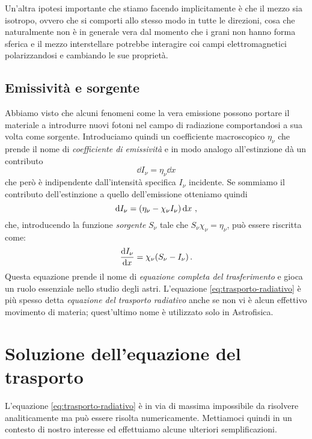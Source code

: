         Un'altra ipotesi importante che stiamo facendo implicitamente è che il mezzo sia isotropo, ovvero che si comporti allo stesso modo in tutte le direzioni, cosa che naturalmente non è in generale vera dal momento che i grani non hanno forma sferica e il mezzo interstellare potrebbe interagire coi campi elettromagnetici polarizzandosi e cambiando le sue proprietà.
    \subsection{Emissività e sorgente}
        Abbiamo visto che alcuni fenomeni come la vera emissione possono portare il materiale a introdurre nuovi fotoni nel campo di radiazione comportandosi a sua volta come sorgente. Introduciamo quindi un coefficiente macroscopico $\eta_\nu$ che prende il nome di \emph{coefficiente di emissività} e in modo analogo all'estinzione dà un contributo
        \begin{equation}
            \label{eq:emissività}
            \dd{I_\nu} = \eta_{\nu}\dd{x}
        \end{equation}
        che però è indipendente dall'intensità specifica $I_\nu$ incidente. Se sommiamo il contributo dell'estinzione a quello dell'emissione otteniamo quindi
        \begin{equation*}
            \dd{I_\nu} = \pqty{\eta_\nu - \chi_\nu I_\nu}\dd{x}
            \mycomma   
        \end{equation*}
        che, introducendo la funzione \emph{sorgente} $S_\nu$ tale che $S_\nu\chi_\nu = \eta_\nu$, può essere riscritta come:
        \begin{equation}
            \label{eq:trasporto-radiativo}
            \dv{I_\nu}{x} = \chi_{\nu}\pqty{S_{\nu} - I_{\nu}}
            \myperiod
        \end{equation}
        Questa equazione prende il nome di \emph{equazione completa del trasferimento} e gioca un ruolo essenziale nello studio degli astri. L'equazione \eqref{eq:trasporto-radiativo} è più spesso detta \emph{equazione del trasporto radiativo} anche se non vi è alcun effettivo movimento di materia; quest'ultimo nome è utilizzato solo in Astrofisica.
\section{Soluzione dell'equazione del trasporto}
    L'equazione \eqref{eq:trasporto-radiativo} è in via di massima impossibile da risolvere analiticamente ma può essere risolta numericamente. Mettiamoci quindi in un contesto di nostro interesse ed effettuiamo alcune ulteriori semplificazioni.

